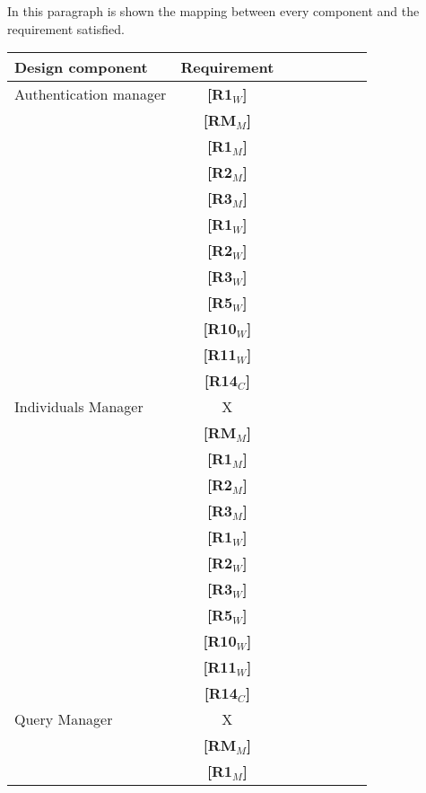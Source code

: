 In this paragraph is shown the mapping between every component and the requirement satisfied.

\begin{tabular}{l*{6}{c}r}
    \hline
    \textbf{Design component} &  \textbf{Requirement} \\
    \hline
    Authentication manager & \textbf{[R1$_W$]}\\
                        & \textbf{[RM$_M$]}\\
                        & \textbf{[R1$_M$]}\\
                        & \textbf{[R2$_M$]}\\
                        & \textbf{[R3$_M$]}\\
                        & \textbf{[R1$_W$]}\\
                        & \textbf{[R2$_W$]}\\
                        & \textbf{[R3$_W$]}\\
                        & \textbf{[R5$_W$]}\\
                        & \textbf{[R10$_W$]}\\
                        & \textbf{[R11$_W$]}\\
                        & \textbf{[R14$_C$]}\\
    \hline
    Individuals Manager & X   \\
                        & \textbf{[RM$_M$]}\\
                        & \textbf{[R1$_M$]}\\
                        & \textbf{[R2$_M$]}\\
                        & \textbf{[R3$_M$]}\\
                        & \textbf{[R1$_W$]}\\
                        & \textbf{[R2$_W$]}\\
                        & \textbf{[R3$_W$]}\\
                        & \textbf{[R5$_W$]}\\
                        & \textbf{[R10$_W$]}\\
                        & \textbf{[R11$_W$]}\\
                        & \textbf{[R14$_C$]}\\
    \hline
    Query Manager & X   \\ 
                        & \textbf{[RM$_M$]}\\
                        & \textbf{[R1$_M$]}\\

\end{tabular}
